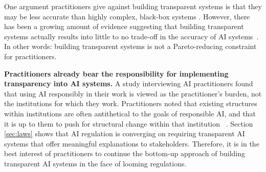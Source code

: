One argument practitioners give against building transparent systems is that they may be less accurate than highly complex, black-box systems \cite{huysmans2006using}. However, there has been a growing amount of evidence suggesting that building transparent systems actually results into little to no trade-off in the accuracy of AI systems~\cite{rudin2019stop, bell2019proactive, stiglic2015comprehensible, de2018predicting}. In other words: building transparent systems is not a Pareto-reducing constraint for practitioners.

{\bf Practitioners already bear the responsibility for implementing transparency into AI systems.} A study interviewing AI practitioners found that using AI responsibly in their work is viewed as the practitioner’s burden, not the institutions for which they work. Practitioners noted that existing structures within institutions are often antithetical to the goals of responsible AI, and that it is up to them to push for structural change within that institution ~\cite{rakova2020responsible}. Section \ref{sec:laws} shows that AI regulation is converging on requiring transparent AI systems that offer meaningful explanations to stakeholders. Therefore, it is in the best interest of practitioners to continue the bottom-up approach of building transparent AI systems in the face of looming regulations.